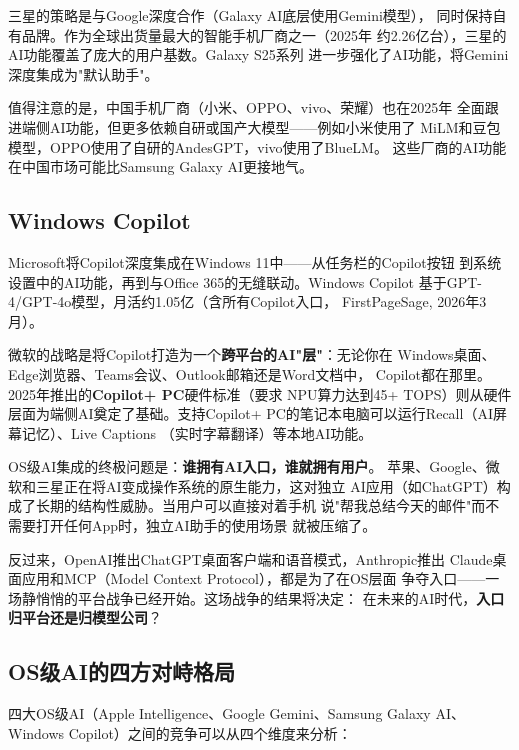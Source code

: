 三星的策略是与Google深度合作（Galaxy AI底层使用Gemini模型），
同时保持自有品牌。作为全球出货量最大的智能手机厂商之一（2025年
约2.26亿台），三星的AI功能覆盖了庞大的用户基数。Galaxy S25系列
进一步强化了AI功能，将Gemini深度集成为"默认助手"。

值得注意的是，中国手机厂商（小米、OPPO、vivo、荣耀）也在2025年
全面跟进端侧AI功能，但更多依赖自研或国产大模型——例如小米使用了
MiLM和豆包模型，OPPO使用了自研的AndesGPT，vivo使用了BlueLM。
这些厂商的AI功能在中国市场可能比Samsung Galaxy AI更接地气。

\subsection{Windows Copilot}
\label{subsec:windows-copilot}

Microsoft将Copilot深度集成在Windows 11中——从任务栏的Copilot按钮
到系统设置中的AI功能，再到与Office 365的无缝联动。Windows Copilot
基于GPT-4/GPT-4o模型，月活约1.05亿（含所有Copilot入口，
FirstPageSage, 2026年3月）。

微软的战略是将Copilot打造为一个\textbf{跨平台的AI"层"}：无论你在
Windows桌面、Edge浏览器、Teams会议、Outlook邮箱还是Word文档中，
Copilot都在那里。2025年推出的\textbf{Copilot+ PC}硬件标准（要求
NPU算力达到45+ TOPS）则从硬件层面为端侧AI奠定了基础。支持Copilot+
PC的笔记本电脑可以运行Recall（AI屏幕记忆）、Live Captions
（实时字幕翻译）等本地AI功能。

OS级AI集成的终极问题是：\textbf{谁拥有AI入口，谁就拥有用户}。
苹果、Google、微软和三星正在将AI变成操作系统的原生能力，这对独立
AI应用（如ChatGPT）构成了长期的结构性威胁。当用户可以直接对着手机
说"帮我总结今天的邮件"而不需要打开任何App时，独立AI助手的使用场景
就被压缩了。

反过来，OpenAI推出ChatGPT桌面客户端和语音模式，Anthropic推出
Claude桌面应用和MCP（Model Context Protocol），都是为了在OS层面
争夺入口——一场静悄悄的平台战争已经开始。这场战争的结果将决定：
在未来的AI时代，\textbf{入口归平台还是归模型公司}？

\subsection{OS级AI的四方对峙格局}
\label{subsec:os-ai-landscape}

四大OS级AI（Apple Intelligence、Google Gemini、Samsung Galaxy AI、
Windows Copilot）之间的竞争可以从四个维度来分析：


